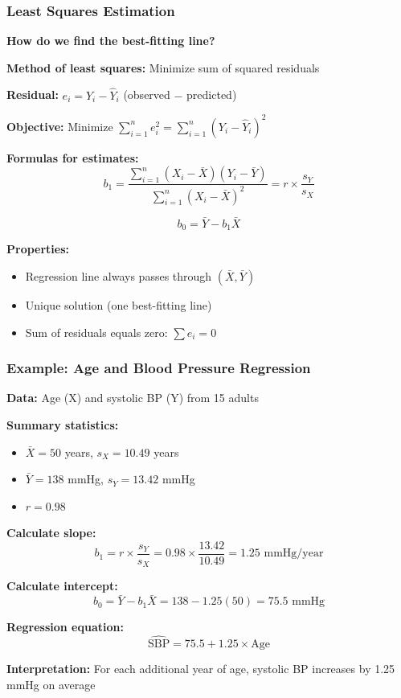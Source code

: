\documentclass{beamer}
\begin{document}
\begin{frame}
\frametitle{Least Squares Estimation}
\textbf{How do we find the best-fitting line?}

\vspace{0.3cm}
\textbf{Method of least squares:} Minimize sum of squared residuals

\vspace{0.3cm}
\textbf{Residual:} $e_i = Y_i - \hat{Y}_i$ (observed $-$ predicted)

\vspace{0.3cm}
\textbf{Objective:} Minimize $\sum_{i=1}^{n} e_i^2 = \sum_{i=1}^{n} (Y_i - \hat{Y}_i)^2$

\vspace{0.5cm}
\textbf{Formulas for estimates:}
$$b_1 = \frac{\sum_{i=1}^{n}(X_i - \bar{X})(Y_i - \bar{Y})}{\sum_{i=1}^{n}(X_i - \bar{X})^2} = r \times \frac{s_Y}{s_X}$$

$$b_0 = \bar{Y} - b_1 \bar{X}$$

\vspace{0.3cm}
\textbf{Properties:}
\begin{itemize}
\item Regression line always passes through $(\bar{X}, \bar{Y})$
\item Unique solution (one best-fitting line)
\item Sum of residuals equals zero: $\sum e_i = 0$
\end{itemize}
\end{frame}

\begin{frame}
\frametitle{Example: Age and Blood Pressure Regression}
\textbf{Data:} Age (X) and systolic BP (Y) from 15 adults

\vspace{0.3cm}
\textbf{Summary statistics:}
\begin{itemize}
\item $\bar{X} = 50$ years, $s_X = 10.49$ years
\item $\bar{Y} = 138$ mmHg, $s_Y = 13.42$ mmHg
\item $r = 0.98$
\end{itemize}

\vspace{0.3cm}
\textbf{Calculate slope:}
$$b_1 = r \times \frac{s_Y}{s_X} = 0.98 \times \frac{13.42}{10.49} = 1.25 \text{ mmHg/year}$$

\textbf{Calculate intercept:}
$$b_0 = \bar{Y} - b_1 \bar{X} = 138 - 1.25(50) = 75.5 \text{ mmHg}$$

\vspace{0.3cm}
\textbf{Regression equation:}
$$\widehat{\text{SBP}} = 75.5 + 1.25 \times \text{Age}$$

\textbf{Interpretation:} For each additional year of age, systolic BP increases by 1.25 mmHg on average
\end{frame}
\end{document}
